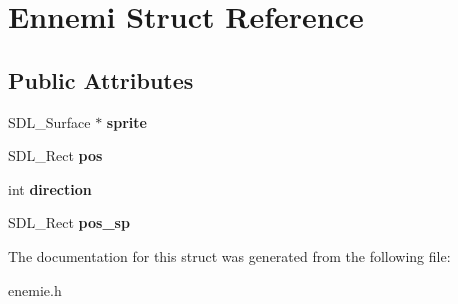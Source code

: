 \hypertarget{structEnnemi}{}\section{Ennemi Struct Reference}
\label{structEnnemi}
\subsection*{Public Attributes}
\begin{DoxyCompactItemize}
\item 
S\+D\+L\+\_\+\+Surface $\ast$ {\bfseries sprite}\hypertarget{structEnnemi_adb0efeb167c3a5c5981ec5ef704ee94b}{}\label{structEnnemi_adb0efeb167c3a5c5981ec5ef704ee94b}

\item 
S\+D\+L\+\_\+\+Rect {\bfseries pos}\hypertarget{structEnnemi_a3d61487c6391b8391b4334cb3f5272e7}{}\label{structEnnemi_a3d61487c6391b8391b4334cb3f5272e7}

\item 
int {\bfseries direction}\hypertarget{structEnnemi_a5fcc1b018d910c113d7f1cf2771fb900}{}\label{structEnnemi_a5fcc1b018d910c113d7f1cf2771fb900}

\item 
S\+D\+L\+\_\+\+Rect {\bfseries pos\+\_\+sp}\hypertarget{structEnnemi_a51c0688f2281052086eb3092cb8ff485}{}\label{structEnnemi_a51c0688f2281052086eb3092cb8ff485}

\end{DoxyCompactItemize}


The documentation for this struct was generated from the following file\+:\begin{DoxyCompactItemize}
\item 
enemie.\+h\end{DoxyCompactItemize}
